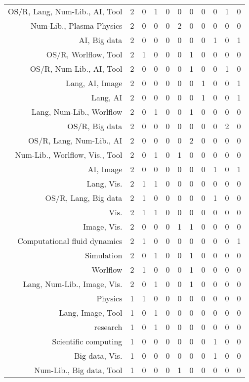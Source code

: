 {\begin{landscape}
\begin{longtable}[htb]{r|c|c|c|c|c|c|c|c|c|c}
{OS/R, Lang, Num-Lib., AI, Tool} & 2 & 0 & 1 & 0 & 0 & 0 & 0 & 0 & 1 & 0 \\%
{Num-Lib., Plasma Physics} & 2 & 0 & 0 & 0 & 2 & 0 & 0 & 0 & 0 & 0 \\%
{AI, Big data} & 2 & 0 & 0 & 0 & 0 & 0 & 0 & 1 & 0 & 1 \\%
{OS/R, Worlflow, Tool} & 2 & 1 & 0 & 0 & 0 & 1 & 0 & 0 & 0 & 0 \\%
{OS/R, Num-Lib., AI, Tool} & 2 & 0 & 0 & 0 & 0 & 1 & 0 & 0 & 1 & 0 \\%
{Lang, AI, Image} & 2 & 0 & 0 & 0 & 0 & 0 & 1 & 0 & 0 & 1 \\%
{Lang, AI} & 2 & 0 & 0 & 0 & 0 & 0 & 1 & 0 & 0 & 1 \\%
{Lang, Num-Lib., Worlflow} & 2 & 0 & 1 & 0 & 0 & 1 & 0 & 0 & 0 & 0 \\%
{OS/R, Big data} & 2 & 0 & 0 & 0 & 0 & 0 & 0 & 0 & 2 & 0 \\%
{OS/R, Lang, Num-Lib., AI} & 2 & 0 & 0 & 0 & 0 & 2 & 0 & 0 & 0 & 0 \\%
{Num-Lib., Worlflow, Vis., Tool} & 2 & 0 & 1 & 0 & 1 & 0 & 0 & 0 & 0 & 0 \\%
{AI, Image} & 2 & 0 & 0 & 0 & 0 & 0 & 0 & 1 & 0 & 1 \\%
{Lang, Vis.} & 2 & 1 & 1 & 0 & 0 & 0 & 0 & 0 & 0 & 0 \\%
{OS/R, Lang, Big data} & 2 & 1 & 0 & 0 & 0 & 0 & 0 & 1 & 0 & 0 \\%
{Vis.} & 2 & 1 & 1 & 0 & 0 & 0 & 0 & 0 & 0 & 0 \\%
{Image, Vis.} & 2 & 0 & 0 & 0 & 1 & 1 & 0 & 0 & 0 & 0 \\%
{Computational fluid dynamics} & 2 & 1 & 0 & 0 & 0 & 0 & 0 & 0 & 0 & 1 \\%
{Simulation} & 2 & 0 & 1 & 0 & 0 & 1 & 0 & 0 & 0 & 0 \\%
{Worlflow} & 2 & 1 & 0 & 0 & 0 & 1 & 0 & 0 & 0 & 0 \\%
{Lang, Num-Lib., Image, Vis.} & 2 & 0 & 1 & 0 & 0 & 1 & 0 & 0 & 0 & 0 \\%
{Physics} & 1 & 1 & 0 & 0 & 0 & 0 & 0 & 0 & 0 & 0 \\%
{Lang, Image, Tool} & 1 & 0 & 1 & 0 & 0 & 0 & 0 & 0 & 0 & 0 \\%
{research} & 1 & 0 & 1 & 0 & 0 & 0 & 0 & 0 & 0 & 0 \\%
{Scientific computing} & 1 & 0 & 0 & 0 & 0 & 0 & 0 & 1 & 0 & 0 \\%
{Big data, Vis.} & 1 & 0 & 0 & 0 & 0 & 0 & 0 & 1 & 0 & 0 \\%
{Num-Lib., Big data, Tool} & 1 & 0 & 0 & 0 & 1 & 0 & 0 & 0 & 0 & 0 \\%

\end{longtable}
\end{landscape}}
